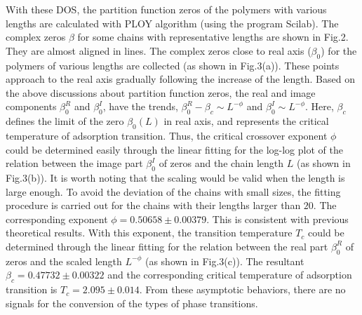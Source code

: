 \documentclass[aps,pre,twocolumn,showpacs,preprintnumbers,amsmath,amssymb]{revtex4-1}
\begin{document}
With these DOS, the partition function zeros of the polymers
with various lengths are calculated with PLOY algorithm (using
the program Scilab). The complex zeros $\beta$ for some chains
with representative lengths are shown in Fig.2. They are almost
aligned in lines. The complex zeros close to real axis
($\beta_0$) for the polymers of various lengths are collected
(as shown in Fig.3(a)). These points approach to the real axis
gradually following the increase of the length. Based on the
above discussions about partition function zeros, the real and
image components $\beta_0^R$ and $\beta_0^I$, have the trends,
$\beta_0^R - \beta_c \sim L^{-\phi}$ and $\beta_0^I \sim
L^{-\phi}$. Here, $\beta_c$ defines the limit of the zero
$\beta_0(L)$ in real axis, and represents the critical
temperature of adsorption transition. Thus, the critical
crossover exponent $\phi$ could be determined easily through the
linear fitting for the log-log plot of the relation between the
image part $\beta_0^I$ of zeros and the chain length $L$ (as
shown in Fig.3(b)). It is worth noting that the scaling would be
valid when the length is large enough. To avoid the deviation of
the chains with small sizes, the fitting procedure is carried
out for the chains with their lengths larger than $20$. The
corresponding exponent $\phi=0.50658 \pm 0.00379$. This is
consistent with previous theoretical results\cite{PRL95}. With
this exponent, the transition temperature $T_c$ could be
determined through the linear fitting for the relation between
the real part $\beta_0^R$ of zeros and the scaled length
$L^{-\phi}$ (as shown in Fig.3(c)). The resultant
$\beta_c=0.47732 \pm 0.00322$ and the corresponding critical
temperature of adsorption transition is $T_c=2.095 \pm 0.014$.
From these asymptotic behaviors, there are no signals for the
conversion of the types of phase transitions.
\end{document}
